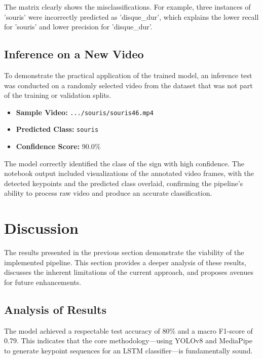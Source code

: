 \documentclass[11pt, a4paper]{article}
\begin{document}
The matrix clearly shows the misclassifications. For example, three instances of 'souris' were incorrectly predicted as 'disque\_dur', which explains the lower recall for 'souris' and lower precision for 'disque\_dur'.

\subsection{Inference on a New Video}
To demonstrate the practical application of the trained model, an inference test was conducted on a randomly selected video from the dataset that was not part of the training or validation splits.
\begin{itemize}
    \item \textbf{Sample Video:} \texttt{.../souris/souris46.mp4}
    \item \textbf{Predicted Class:} \texttt{souris}
    \item \textbf{Confidence Score:} 90.0\%
\end{itemize}
The model correctly identified the class of the sign with high confidence. The notebook output included visualizations of the annotated video frames, with the detected keypoints and the predicted class overlaid, confirming the pipeline's ability to process raw video and produce an accurate classification.



\section{Discussion}
The results presented in the previous section demonstrate the viability of the implemented pipeline. This section provides a deeper analysis of these results, discusses the inherent limitations of the current approach, and proposes avenues for future enhancements.

\subsection{Analysis of Results}
The model achieved a respectable test accuracy of 80\% and a macro F1-score of 0.79. This indicates that the core methodology—using YOLOv8 and MediaPipe to generate keypoint sequences for an LSTM classifier—is fundamentally sound.
\end{document}
